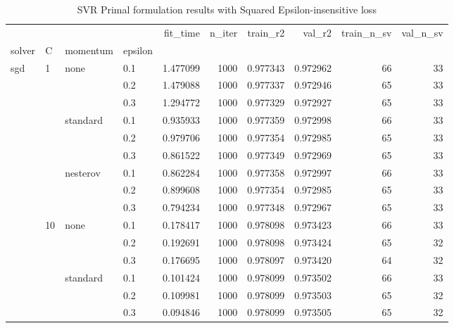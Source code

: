 \begin{table}[H]
\centering
\caption{SVR Primal formulation results with Squared Epsilon-insensitive loss}
\label{primal_svr_squared_eps_cv_results}
\begin{tabular}{llllrrrrrr}
\toprule
          &     &   &     &  fit\_time &  n\_iter &  train\_r2 &    val\_r2 &  train\_n\_sv &  val\_n\_sv \\
solver & C & momentum & epsilon &           &         &           &           &             &           \\
\midrule
sgd & 1   & none & 0.1 &  1.477099 &    1000 &  0.977343 &  0.972962 &          66 &        33 \\
          &     &   & 0.2 &  1.479088 &    1000 &  0.977337 &  0.972946 &          65 &        33 \\
          &     &   & 0.3 &  1.294772 &    1000 &  0.977329 &  0.972927 &          65 &        33 \\
          &     & standard & 0.1 &  0.935933 &    1000 &  0.977359 &  0.972998 &          66 &        33 \\
          &     &   & 0.2 &  0.979706 &    1000 &  0.977354 &  0.972985 &          65 &        33 \\
          &     &   & 0.3 &  0.861522 &    1000 &  0.977349 &  0.972969 &          65 &        33 \\
          &     & nesterov & 0.1 &  0.862284 &    1000 &  0.977358 &  0.972997 &          66 &        33 \\
          &     &   & 0.2 &  0.899608 &    1000 &  0.977354 &  0.972985 &          65 &        33 \\
          &     &   & 0.3 &  0.794234 &    1000 &  0.977348 &  0.972967 &          65 &        33 \\
          & 10  & none & 0.1 &  0.178417 &    1000 &  0.978098 &  0.973423 &          66 &        33 \\
          &     &   & 0.2 &  0.192691 &    1000 &  0.978098 &  0.973424 &          65 &        32 \\
          &     &   & 0.3 &  0.176695 &    1000 &  0.978097 &  0.973420 &          64 &        32 \\
          &     & standard & 0.1 &  0.101424 &    1000 &  0.978099 &  0.973502 &          66 &        33 \\
          &     &   & 0.2 &  0.109981 &    1000 &  0.978099 &  0.973503 &          65 &        32 \\
          &     &   & 0.3 &  0.094846 &    1000 &  0.978099 &  0.973505 &          65 &        32 \\

\end{tabular}
\end{table}
